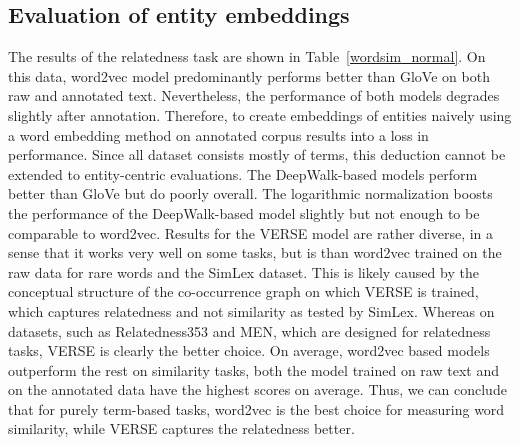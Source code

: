 \subsection{Evaluation of entity embeddings}\label{subsec:eval_entity}
The results of the relatedness task are shown in Table~\ref{wordsim_normal}. On this data, word2vec model predominantly performs better than GloVe on both raw and annotated text. Nevertheless, the performance of both models degrades slightly after annotation. 
Therefore, to create embeddings of entities naively using a word embedding method on annotated corpus results into a loss in performance. Since all dataset consists mostly of terms, this deduction cannot be extended to entity-centric evaluations. The DeepWalk-based models perform better than GloVe but do poorly overall. The logarithmic normalization boosts the performance of the DeepWalk-based model slightly but not enough to be comparable to word2vec. Results for the VERSE model are rather diverse, in a sense that it works very well on some tasks, but is than word2vec trained on the raw data for rare words and the SimLex dataset. This is likely caused by the conceptual structure of the co-occurrence graph on which VERSE is trained, which captures relatedness and not similarity as tested by SimLex. Whereas on datasets, such as Relatedness353 and MEN, which are designed for relatedness tasks, VERSE is clearly the better choice. On average, word2vec based models outperform the rest on similarity tasks, both the model trained on raw text and on the annotated data have the highest scores on average. Thus, we can conclude that for purely term-based tasks, word2vec is the best choice for measuring word similarity, while VERSE captures the relatedness better. 

